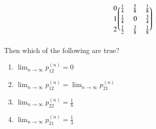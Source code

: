 \begin{enumerate}[label=\thesection.\arabic*.,ref=\thesection.\theenumi]
\begin{align}
\begin{blockarray}{c@{\hspace{1pt}}rrr@{\hspace{3pt}}}
\begin{block}{r@{\hspace{3pt}}@{\hspace{1pt}}
    (@{\hspace{1pt}}rrr@{\hspace{1pt}}@{\hspace{1pt}})}
        0 & \frac{1}{4} & \frac{5}{8} & \frac{1}{8}  \\[1mm]
        1 & \frac{1}{4} & 0 & \frac{3}{4}  \\[1mm]
        2 &  \frac{1}{2} & \frac{3}{8} & \frac{1}{8}  \\
        \end{block}
    \end{blockarray}
\end{align}
Then which of the following are true?
\begin{enumerate}
\item $\lim_{n \to \infty} p_{12}^{(n)} = 0$
\item $\lim_{n \to \infty} p_{12}^{(n)} = \lim_{n \to \infty} p_{21}^{(n)}$
\item $\lim_{n \to \infty} p_{22}^{(n)} = \frac{1}{8}$
\item $\lim_{n \to \infty} p_{21}^{(n)} = \frac{1}{3}$
\end{enumerate}
\end{enumerate}

